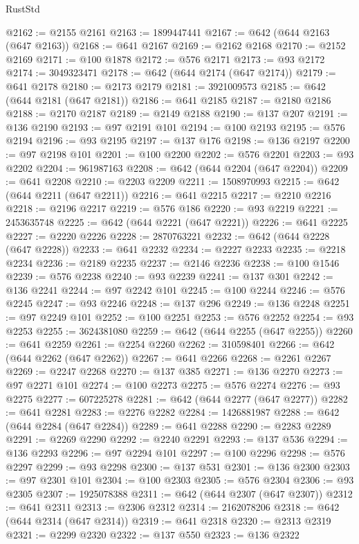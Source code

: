 \begin{lexlean}{RustStd}
\begin{coremodule}
@2162 := @2155 @2161
@2163 := 1899447441
@2167 := @642 (@644 @2163 (@647 @2163))
@2168 := @641 @2167
@2169 := @2162 @2168
@2170 := @2152 @2169
@2171 := @100 @1878
@2172 := @576 @2171
@2173 := @93 @2172
@2174 := 3049323471
@2178 := @642 (@644 @2174 (@647 @2174))
@2179 := @641 @2178
@2180 := @2173 @2179
@2181 := 3921009573
@2185 := @642 (@644 @2181 (@647 @2181))
@2186 := @641 @2185
@2187 := @2180 @2186
@2188 := @2170 @2187
@2189 := @2149 @2188
@2190 := @137 @207
@2191 := @136 @2190
@2193 := @97 @2191 @101
@2194 := @100 @2193
@2195 := @576 @2194
@2196 := @93 @2195
@2197 := @137 @176
@2198 := @136 @2197
@2200 := @97 @2198 @101
@2201 := @100 @2200
@2202 := @576 @2201
@2203 := @93 @2202
@2204 := 961987163
@2208 := @642 (@644 @2204 (@647 @2204))
@2209 := @641 @2208
@2210 := @2203 @2209
@2211 := 1508970993
@2215 := @642 (@644 @2211 (@647 @2211))
@2216 := @641 @2215
@2217 := @2210 @2216
@2218 := @2196 @2217
@2219 := @576 @186
@2220 := @93 @2219
@2221 := 2453635748
@2225 := @642 (@644 @2221 (@647 @2221))
@2226 := @641 @2225
@2227 := @2220 @2226
@2228 := 2870763221
@2232 := @642 (@644 @2228 (@647 @2228))
@2233 := @641 @2232
@2234 := @2227 @2233
@2235 := @2218 @2234
@2236 := @2189 @2235
@2237 := @2146 @2236
@2238 := @100 @1546
@2239 := @576 @2238
@2240 := @93 @2239
@2241 := @137 @301
@2242 := @136 @2241
@2244 := @97 @2242 @101
@2245 := @100 @2244
@2246 := @576 @2245
@2247 := @93 @2246
@2248 := @137 @296
@2249 := @136 @2248
@2251 := @97 @2249 @101
@2252 := @100 @2251
@2253 := @576 @2252
@2254 := @93 @2253
@2255 := 3624381080
@2259 := @642 (@644 @2255 (@647 @2255))
@2260 := @641 @2259
@2261 := @2254 @2260
@2262 := 310598401
@2266 := @642 (@644 @2262 (@647 @2262))
@2267 := @641 @2266
@2268 := @2261 @2267
@2269 := @2247 @2268
@2270 := @137 @385
@2271 := @136 @2270
@2273 := @97 @2271 @101
@2274 := @100 @2273
@2275 := @576 @2274
@2276 := @93 @2275
@2277 := 607225278
@2281 := @642 (@644 @2277 (@647 @2277))
@2282 := @641 @2281
@2283 := @2276 @2282
@2284 := 1426881987
@2288 := @642 (@644 @2284 (@647 @2284))
@2289 := @641 @2288
@2290 := @2283 @2289
@2291 := @2269 @2290
@2292 := @2240 @2291
@2293 := @137 @536
@2294 := @136 @2293
@2296 := @97 @2294 @101
@2297 := @100 @2296
@2298 := @576 @2297
@2299 := @93 @2298
@2300 := @137 @531
@2301 := @136 @2300
@2303 := @97 @2301 @101
@2304 := @100 @2303
@2305 := @576 @2304
@2306 := @93 @2305
@2307 := 1925078388
@2311 := @642 (@644 @2307 (@647 @2307))
@2312 := @641 @2311
@2313 := @2306 @2312
@2314 := 2162078206
@2318 := @642 (@644 @2314 (@647 @2314))
@2319 := @641 @2318
@2320 := @2313 @2319
@2321 := @2299 @2320
@2322 := @137 @550
@2323 := @136 @2322

\end{coremodule}
\end{lexlean}
